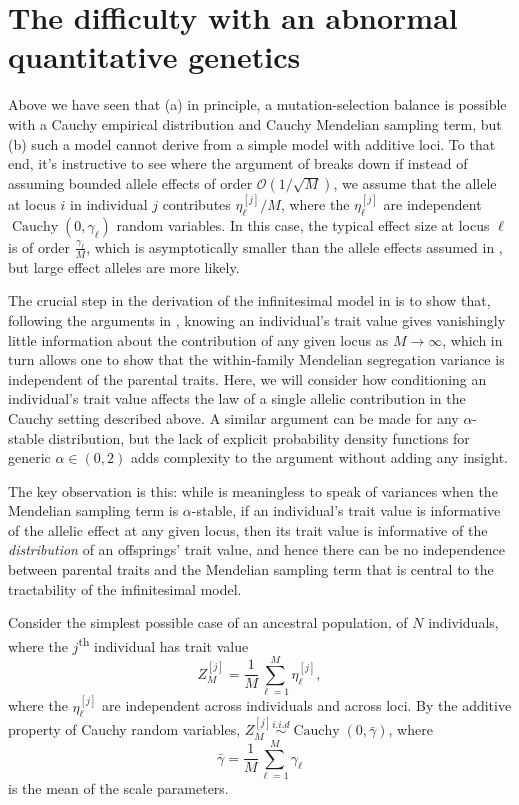 \documentclass{article}
\newcommand{\iid}{\overset{i.i.d}{\sim}}
\newcommand{\1}{\mathbbm{1}}
\newcommand{\Oh}{{\mathcal O}}
\DeclareMathOperator*{\Cauchy}{Cauchy}
\theoremstyle{remark}
\theoremstyle{definition}
\begin{document}
\section{The difficulty with an abnormal quantitative genetics}

Above we have seen that
(a) in principle,
a mutation-selection balance is possible with a Cauchy empirical distribution and Cauchy Mendelian sampling term,
but (b)
such a model cannot derive from a simple model with additive loci.
To that end, it's instructive to see where the argument of \cite{barton2017infinitesimal} breaks down
if instead of assuming bounded allele effects of order $\Oh\left(1/\sqrt{M}\right)$,
we assume that the allele at locus $i$ in individual $j$ contributes
$\eta^{[j]}_{\ell}/M$, where the $\eta^{[j]}_{\ell}$ are independent $\Cauchy(0,\gamma_{\ell})$ random variables. 
In this case, the typical effect size at locus $\ell$ is of order $\frac{\gamma_{\ell}}{M}$,
which is asymptotically smaller than the allele effects assumed in \cite{barton2017infinitesimal},
but large effect alleles are more likely. 

The crucial step in the derivation of the infinitesimal model in \cite{barton2017infinitesimal} is to show that, following the arguments in \cite{Fisher1918}, knowing an individual's trait value gives vanishingly little information about the contribution of any given locus as $M \to \infty$, which in turn allows one to show that the within-family Mendelian segregation variance is independent of the parental traits. Here, we will consider how conditioning an individual's trait value affects the law of a single allelic contribution in the Cauchy setting described above. A similar argument can be made for any $\alpha$-stable distribution, but the lack of explicit probability density functions for generic $\alpha \in (0,2)$ adds complexity to the argument without adding any insight. 

The key observation is this:
while is meaningless to speak of variances when the Mendelian sampling term is $\alpha$-stable, if an individual's trait value is informative of the allelic effect at any given locus,
then its trait value is informative of the \emph{distribution} of an offsprings' trait value,
and hence there can be no independence between parental traits and the Mendelian sampling term
that is central to the tractability of the infinitesimal model.  

Consider the simplest possible case of an ancestral population, of $N$ individuals, where the $j$\textsuperscript{th} individual has trait value 
\[
	Z^{[j]}_{M} = \frac{1}{M} \sum_{\ell = 1}^{M}  \eta^{[j]}_{\ell},
\]
where the $\eta^{[j]}_{\ell}$ are independent across individuals and across loci.  By the additive property of Cauchy random variables, $Z^{[j]}_M \iid \Cauchy(0,\bar{\gamma})$, where 
\[
	\bar{\gamma} = \frac{1}{M} \sum_{\ell = 1}^{M} \gamma_{\ell}
\]
is the mean of the scale parameters.  
\end{document}
